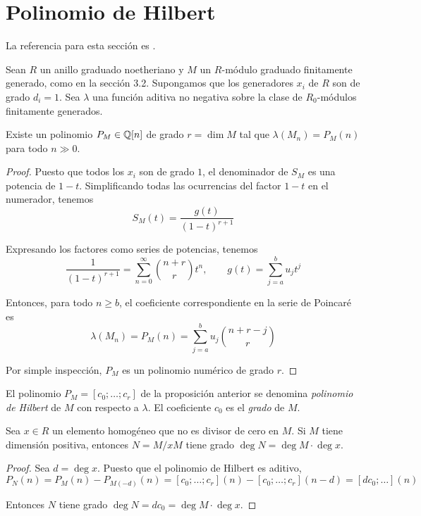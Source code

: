 \section{Polinomio de Hilbert}

\noindent La referencia para esta sección es \cite[pp. 117-118]{atiyah}.

\begin{preliminaries}
Sean $R$ un anillo graduado noetheriano y $M$ un $R$-módulo graduado finitamente generado, como en la sección 3.2. Supongamos que los generadores $x_i$ de $R$ son de grado $d_i = 1$. Sea $\lambda$ una función aditiva no negativa sobre la clase de $R_0$-módulos finitamente generados.
\end{preliminaries}

\begin{proposition}
Existe un polinomio $P_M \in \mathbb Q[n]$ de grado $r = \dim M$ tal que $\lambda(M_n) = P_M(n)$ para todo $n \gg 0$.
\end{proposition}

\begin{proof}
Puesto que todos los $x_i$ son de grado $1$, el denominador de $S_M$ es una potencia de $1-t$. Simplificando todas las ocurrencias del factor $1-t$ en el numerador, tenemos
$$S_M(t) = \frac {g(t)} {(1-t)^{r+1}}$$

Expresando los factores como series de potencias, tenemos
$$\frac 1 {(1-t)^{r+1}} = \sum_{n=0}^\infty \binom {n+r} r t^n, \qquad g(t) = \sum_{j=a}^b u_j t^j$$

Entonces, para todo $n \ge b$, el coeficiente correspondiente en la serie de Poincaré es
$$\lambda(M_n) = P_M(n) = \sum_{j=a}^b u_j \binom {n+r-j} r$$

Por simple inspección, $P_M$ es un polinomio numérico de grado $r$.
\end{proof}

\begin{definition}
El polinomio $P_M = [c_0; \dots; c_r]$ de la proposición anterior se denomina \textit{polinomio de Hilbert} de $M$ con respecto a $\lambda$. El coeficiente $c_0$ es el \textit{grado} de $M$.
\end{definition}

\begin{corollary}
Sea $x \in R$ un elemento homogéneo que no es divisor de cero en $M$. Si $M$ tiene dimensión positiva, entonces $N = M/xM$ tiene grado $\deg N = \deg M \cdot \deg x$.
\end{corollary}

\begin{proof}
Sea $d = \deg x$. Puesto que el polinomio de Hilbert es aditivo,
$$P_N(n) = P_M(n) - P_{M(-d)}(n) = [c_0; \dots; c_r](n) - [c_0; \dots; c_r](n-d) = [dc_0; \dots](n)$$

Entonces $N$ tiene grado $\deg N = dc_0 = \deg M \cdot \deg x$.
\end{proof}

